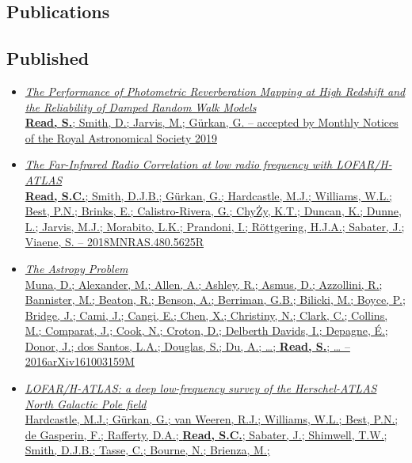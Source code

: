 \documentclass[letterpaper]{twentysecondcv} %
\begin{document}
\begin{finalpages}
\section{Publications}
\subsection{Published}
\begin{itemize}
     \item \href{http://shaun.science/publication/2019-12-06-The-Performance-of-Photometric-Reverberation-Mapping-at-High-Redshift-and-the-Reliability-of-Damped-Random-Walk-Models}{\textit{The Performance of Photometric Reverberation Mapping at High Redshift
and the Reliability of Damped Random Walk Models}\\{\small \textbf{Read, S.}; Smith, D.; Jarvis, M.; Gürkan, G. -- accepted by Monthly Notices of the Royal Astronomical Society 2019}}
 \item \href{http://shaun.science/publication/2018-11-00-The-Far-Infrared-Radio-Correlation-at-low-radio-frequency-with-LOFAR-H-ATLAS}{\textit{The Far-Infrared Radio Correlation at low radio frequency with
LOFAR/H-ATLAS}\\{\small \textbf{Read, S.C.}; Smith, D.J.B.; Gürkan, G.; Hardcastle, M.J.;
Williams, W.L.; Best, P.N.; Brinks, E.; Calistro-Rivera, G.; ChyŻy,
K.T.; Duncan, K.; Dunne, L.; Jarvis, M.J.; Morabito, L.K.; Prandoni, I.;
Röttgering, H.J.A.; Sabater, J.; Viaene, S. -- 2018MNRAS.480.5625R}}
 \item \href{http://shaun.science/publication/2016-10-00-The-Astropy-Problem}{\textit{The Astropy Problem}\\{\small Muna, D.; Alexander, M.; Allen, A.; Ashley, R.; Asmus, D.; Azzollini,
R.; Bannister, M.; Beaton, R.; Benson, A.; Berriman, G.B.; Bilicki, M.;
Boyce, P.; Bridge, J.; Cami, J.; Cangi, E.; Chen, X.; Christiny, N.;
Clark, C.; Collins, M.; Comparat, J.; Cook, N.; Croton, D.; Delberth
Davids, I.; Depagne, É.; Donor, J.; dos Santos, L.A.; Douglas, S.; Du,
A.; \ldots; \textbf{Read, S.}; \ldots{} -- 2016arXiv161003159M}}
 \item \href{http://shaun.science/publication/2016-10-00-LOFAR-H-ATLAS}{\textit{LOFAR/H-ATLAS: a deep low-frequency survey of the Herschel-ATLAS North
Galactic Pole field}\\{\small Hardcastle, M.J.; Gürkan, G.; van Weeren, R.J.; Williams, W.L.; Best,
P.N.; de Gasperin, F.; Rafferty, D.A.; \textbf{Read, S.C.}; Sabater, J.;
Shimwell, T.W.; Smith, D.J.B.; Tasse, C.; Bourne, N.; Brienza, M.;
}}
\end{itemize}
\end{finalpages}
\end{document}
